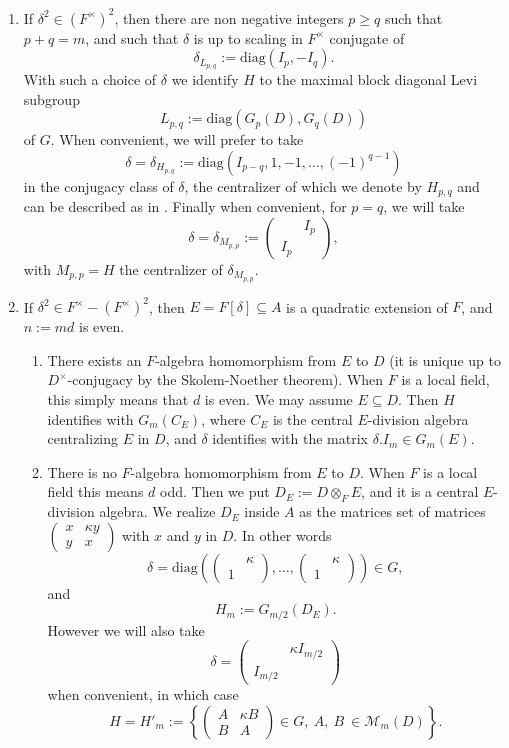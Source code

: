 \documentclass[11pt,letterpaper]{amsart}
\newcommand{\CM}{{\mathcal {M}}} \newcommand{\CN}{{\mathcal {N}}}\newcommand{\CO}{{\mathcal {O}}}\newcommand{\CP}{{\mathcal {P}}}
\def\d{\delta}
\def\k{\kappa}
\def\diag{\mathrm{diag}}
\theoremstyle{plain}
\numberwithin{equation}{section}
\begin{document}
\begin{enumerate}[1)]
\item If $\d^2\in (F^\times)^2$, then there are non negative integers $p\geq q$ such that $p+q=m$, and such that $\d$ is up to scaling in $F^\times$ conjugate of \[\d_{L_{p,q}}:=\diag(I_p,-I_q).\] With such a choice of $\delta$ we identify 
$H$ to the maximal block 
diagonal Levi subgroup 
\[L_{p,q}:=\diag(G_p(D),G_q(D))\] of $G$. 
When convenient, we will prefer to 
take \[\delta=\d_{H_{p,q}}:=\diag(I_{p-q},1,-1,\dots,(-1)^{q-1})\] in the conjugacy class of $\delta$, the centralizer of which we denote by $H_{p,q}$ and can be described as in \cite{MatCRAS}. Finally when convenient, for $p=q$, we will take 
\[\delta=\d_{M_{p,p}}:= \begin{pmatrix}  & I_p \\ I_p & \end{pmatrix},\] with $M_{p,p}=H$ the centralizer of $\d_{M_{p,p}}$. 
\item If $\d^2\in F^\times-(F^\times)^2$, then $E=F[\delta]\subseteq A$ is a quadratic extension of $F$, and $n:=md$ is even.
\begin{enumerate}
\item There exists an $F$-algebra homomorphism from $E$ to $D$ (it is unique up to $D^\times$-conjugacy by the Skolem-Noether theorem). When $F$ is a local field, this simply means that $d$ is even. We may assume $E\subseteq D$. Then $H$ identifies with 
$G_m(C_E)$, where $C_E$ is the central $E$-division algebra centralizing $E$ in $D$, and $\d$ identifies with the matrix 
$\d.I_m\in G_m(E)$.
\item There is no $F$-algebra homomorphism from $E$ to $D$. When $F$ is a local field this means $d$ odd. Then we put $D_E:=D\otimes_F E$, and it is a central $E$-division algebra. We realize $D_E$ inside 
$A$ as the matrices set of matrices $\begin{pmatrix} x& \k y\\ y& x\end{pmatrix}$ with $x$ and $y$ in $D$. In other words  
\[\delta=\diag\left(\begin{pmatrix} & \k\\ 1& \end{pmatrix},\dots,\begin{pmatrix} & \k\\ 1& \end{pmatrix}\right)\in G,\] and 
\[H_m:=G_{m/2}(D_E).\]
However we will also take \[\delta=\begin{pmatrix} & \k I_{m/2}\\ I_{m/2}& \end{pmatrix} \] when convenient, in which case 
\[H=H'_m:=\left\{\begin{pmatrix} A& \k B\\ B & A \end{pmatrix}\in G, \ A, \ B \ \in \CM_m(D)\right\}.\]
\end{enumerate}
\end{enumerate}
\end{document}

